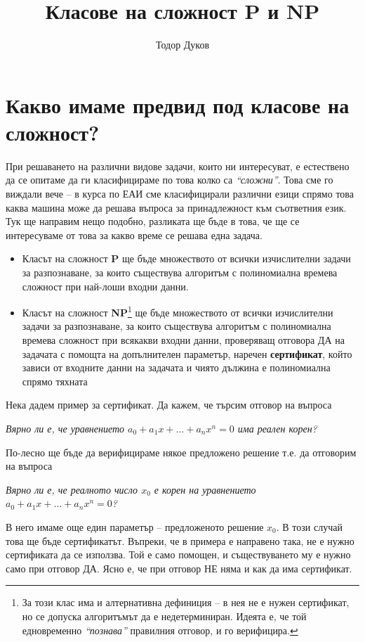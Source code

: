 \documentclass{article}
\title{Класове на сложност \textbf{P} и \textbf{NP}}
\author{Тодор Дуков}
\date{}
\theoremstyle{definition}
\theoremstyle{plain}
\theoremstyle{remark}
\theoremstyle{definition}
\begin{document}
\maketitle

\section*{Какво имаме предвид под класове на сложност?}

При решаването на различни видове задачи, които ни интересуват, е естествено да се опитаме да ги класифицираме по това колко са \textit{``сложни''}.
Това сме го виждали вече -- в курса по ЕАИ сме класифицирали различни езици спрямо това каква машина може да решава въпроса за принадлежност към съответния език.
Тук ще направим нещо подобно, разликата ще бъде в това, че ще се интересуваме от това за какво време се решава една задача.
\begin{itemize}
    \item Класът на сложност \textbf{P} ще бъде множеството от всички изчислителни задачи за разпознаване, за които съществува алгоритъм с полиномиална времева сложност при най-лоши входни данни.
    \item Класът на сложност \textbf{NP}\footnote{
              За този клас има и алтернативна дефиниция -- в нея не е нужен сертификат, но се допуска алгоритъмът да е недетерминиран.
              Идеята е, че той едновременно \textit{``познава''} правилния отговор, и го верифицира.
          } ще бъде множеството от всички изчислителни задачи за разпознаване, за които съществува алгоритъм с полиномиална времева сложност при всякакви входни данни, проверяващ отговора ДА на задачата с помощта на допълнителен параметър, наречен \textbf{сертификат}, който зависи от входните данни на задачата и чиято дължина е полиномиална спрямо тяхната
\end{itemize}
Нека дадем пример за сертификат.
Да кажем, че търсим отговор на въпроса
\begin{center}
    \textit{Вярно ли е, че уравнението $a_0 + a_1 x + \dots + a_n x^n = 0$ има реален корен?}
\end{center}
По-лесно ще бъде да верифицираме някое предложено решение т.е. да отговорим на въпроса
\begin{center}
    \textit{Вярно ли е, че реалното число $x_0$ е корен на уравнението $a_0 + a_1 x + \dots + a_n x^n = 0$?}
\end{center}
В него имаме още един параметър -- предложеното решение $x_0$.
В този случай това ще бъде сертификатът.
Въпреки, че в примера е направено така, не е нужно сертификата да се използва.
Той е само помощен, и съществуването му е нужно само при отговор ДА.
Ясно е, че при отговор НЕ няма и как да има сертификат.
\end{document}
